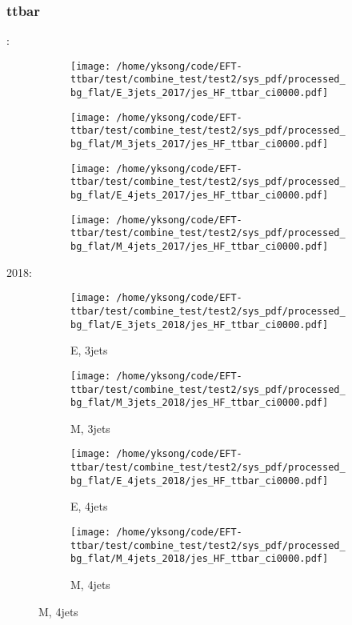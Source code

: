 \documentclass{beamer}
\begin{document}
\begin{frame}
\frametitle{ttbar}
\fontsize{5}{1}:
\begin{figure}
\centering
\begin{subfigure}[b]{0.24\textwidth}
\texttt{[image: /home/yksong/code/EFT-ttbar/test/combine\_test/test2/sys\_pdf/processed\_bg\_flat/E\_3jets\_2017/jes\_HF\_ttbar\_ci0000.pdf]}
\end{subfigure}
\begin{subfigure}[b]{0.24\textwidth}
\texttt{[image: /home/yksong/code/EFT-ttbar/test/combine\_test/test2/sys\_pdf/processed\_bg\_flat/M\_3jets\_2017/jes\_HF\_ttbar\_ci0000.pdf]}
\end{subfigure}
\begin{subfigure}[b]{0.24\textwidth}
\texttt{[image: /home/yksong/code/EFT-ttbar/test/combine\_test/test2/sys\_pdf/processed\_bg\_flat/E\_4jets\_2017/jes\_HF\_ttbar\_ci0000.pdf]}
\end{subfigure}
\begin{subfigure}[b]{0.24\textwidth}
\texttt{[image: /home/yksong/code/EFT-ttbar/test/combine\_test/test2/sys\_pdf/processed\_bg\_flat/M\_4jets\_2017/jes\_HF\_ttbar\_ci0000.pdf]}
\end{subfigure}
\end{figure}
2018:
\begin{figure}
\centering
\begin{subfigure}[b]{0.24\textwidth}
\texttt{[image: /home/yksong/code/EFT-ttbar/test/combine\_test/test2/sys\_pdf/processed\_bg\_flat/E\_3jets\_2018/jes\_HF\_ttbar\_ci0000.pdf]}
\captionsetup{font=tiny}
\caption{E, 3jets}
\end{subfigure}
\begin{subfigure}[b]{0.24\textwidth}
\texttt{[image: /home/yksong/code/EFT-ttbar/test/combine\_test/test2/sys\_pdf/processed\_bg\_flat/M\_3jets\_2018/jes\_HF\_ttbar\_ci0000.pdf]}
\captionsetup{font=tiny}
\caption{M, 3jets}
\end{subfigure}
\begin{subfigure}[b]{0.24\textwidth}
\texttt{[image: /home/yksong/code/EFT-ttbar/test/combine\_test/test2/sys\_pdf/processed\_bg\_flat/E\_4jets\_2018/jes\_HF\_ttbar\_ci0000.pdf]}
\captionsetup{font=tiny}
\caption{E, 4jets}
\end{subfigure}
\begin{subfigure}[b]{0.24\textwidth}
\texttt{[image: /home/yksong/code/EFT-ttbar/test/combine\_test/test2/sys\_pdf/processed\_bg\_flat/M\_4jets\_2018/jes\_HF\_ttbar\_ci0000.pdf]}
\captionsetup{font=tiny}
\caption{M, 4jets}
\end{subfigure}
\end{figure}
\end{frame}
\end{document}
